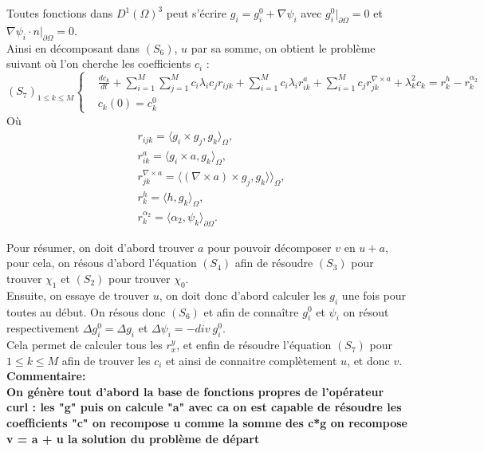 \documentclass[a4paper,11pt]{article} %
\begin{document}
Toutes fonctions dans $D^1(\Omega)^3$ peut s'\'ecrire $g_i=g_i^0+\nabla\psi_i$ avec $g_i^0\big\rvert_{\partial\Omega} = 0$ et $ \nabla\psi_i\cdot n\big\rvert_{\partial\Omega} = 0$.\\
Ainsi en d\'ecomposant dans $(S_6)$, $u$ par sa somme, on obtient le probl\`eme suivant o\`u l'on cherche les coefficients $c_i$ :
\[
(S_7)_{1\leq k\leq M}\left\{
\begin{aligned}
&\frac{dc_k}{dt}+\sum_{i=1}^M\sum_{j=1}^M c_i\lambda_i c_j r_{ijk} + \sum_{i=1}^M c_i \lambda_i r_{ik}^a + \sum_{i=1}^M c_j r_{jk}^{\nabla\times a} + \lambda_k^2 c_k = r_k^h - r_k^{\alpha_2}\\
&c_k(0)=c_k^0
\end{aligned}
\right.
\]
O\`u
\[
\begin{aligned}
&r_{ijk} = \langle g_i\times g_j, g_k\rangle_\Omega,\\
&r_{ik}^a=\langle g_i\times a, g_k\rangle_\Omega,\\
&r_{jk}^{\nabla\times a}=\langle (\nabla\times a)\times g_j, g_k\rangle\rangle_\Omega,\\
&r_k^h=\langle h,g_k\rangle_\Omega,\\
&r_k^{\alpha_2} = \langle \alpha_2,\psi_k\rangle_{\partial\Omega}.
\end{aligned}
\]

Pour r\'esumer, on doit d'abord trouver $a$ pour pouvoir d\'ecomposer $v$ en $u+a$, pour cela, on r\'esous d'abord l'\'equation $(S_4)$ afin de r\'esoudre $(S_3)$ pour trouver $\chi_1$ et $(S_2)$ pour trouver $\chi_0$.\\
Ensuite, on essaye de trouver $u$, on doit donc d'abord calculer les $g_i$ une fois pour toutes au d\'ebut. On r\'esous donc $(S_6)$ et afin de connaître $g_i^0$ et $\psi_i$ on r\'esout respectivement $\Delta g_i^0=\Delta g_i$ et $ \Delta\psi_i= -div\ g_i^0$.\\
Cela permet de calculer tous les $r_x^y$, et enfin de r\'esoudre l'\'equation $(S_7)$ pour $1\leq k\leq M$ afin de trouver les $c_i$ et ainsi de connaitre compl\`etement $u$, et donc $v$.\\


\textbf{Commentaire:\\
On g\'en\`ere tout d'abord la base de fonctions propres de l'op\'erateur curl : les "g"
puis on calcule "a"
avec ca on est capable de r\'esoudre les coefficients "c"
on recompose u comme la somme des c*g
on recompose v = a + u la solution du probl\`eme de d\'epart}
\end{document}
